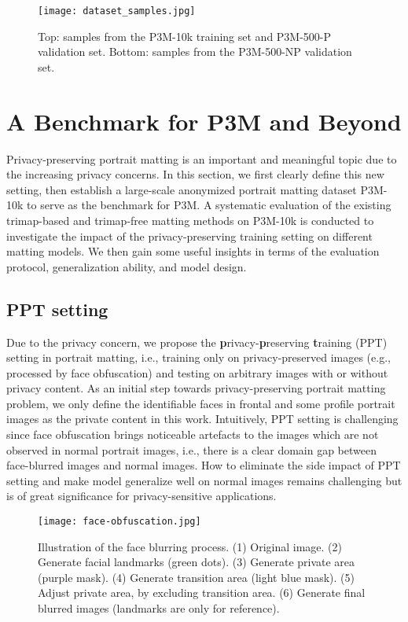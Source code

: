 \documentclass[twocolumn]{svjour3}
\begin{document}
\begin{figure*}
    \centering
    \texttt{[image: dataset\_samples.jpg]}
    \caption{Top: samples from the P3M-10k training set and P3M-500-P validation set. Bottom: samples from the P3M-500-NP validation set.}
    \label{fig:data_p3m-10k}
\end{figure*}

\section{A Benchmark for P3M and Beyond}\label{sec:benchmark}
Privacy-preserving portrait matting is an important and meaningful topic due to the increasing privacy concerns. In this section, we first clearly define this new setting, then establish a large-scale anonymized portrait matting dataset P3M-10k to serve as the benchmark for P3M. A systematic evaluation of the existing trimap-based and trimap-free matting methods on P3M-10k is conducted to investigate the impact of the privacy-preserving training setting on different matting models. We then gain some useful insights in terms of the evaluation protocol, generalization ability, and model design.

\subsection{PPT setting}

Due to the privacy concern, we propose the \textbf{p}rivacy-\textbf{p}reserving \textbf{t}raining (PPT) setting in portrait matting, i.e., training only on privacy-preserved images (e.g., processed by face obfuscation) and testing on arbitrary images with or without privacy content. As an initial step towards privacy-preserving portrait matting problem, we only define the identifiable faces in frontal and some profile portrait images as the private content in this work. Intuitively, PPT setting is challenging since face obfuscation brings noticeable artefacts to the images which are not observed in normal portrait images, i.e., there is a clear domain gap between face-blurred images and normal images. How to eliminate the side impact of PPT setting and make model generalize well on normal images remains challenging but is of great significance for privacy-sensitive applications. 

\begin{figure*}
    \centering
    \texttt{[image: face-obfuscation.jpg]}
    \caption{Illustration of the face blurring process. (1) Original image. (2) Generate facial landmarks (green dots). (3) Generate private area (purple mask). (4) Generate transition area (light blue mask). (5) Adjust private area, by excluding transition area. (6) Generate final blurred images (landmarks are only for reference).}
    \label{fig:face_obfuscation}
\end{figure*}
\end{document}
